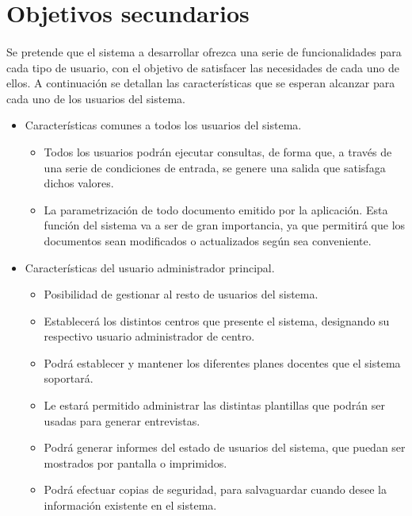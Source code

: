 \section{Objetivos secundarios}

\paragraph{}Se pretende que el sistema a desarrollar ofrezca una serie de
funcionalidades para cada tipo de usuario, con el objetivo de satisfacer las
necesidades de cada uno de ellos. A continuación se detallan las características
que se esperan alcanzar para cada uno de los usuarios del sistema.


\begin{itemize}
   \item Características comunes a todos los usuarios del sistema.
      \begin{itemize}
         \item Todos los usuarios podrán ejecutar consultas, de forma que, a
         través de una serie de condiciones de entrada, se genere una salida que
         satisfaga dichos valores.
         \item La parametrización de todo documento emitido por la aplicación.
         Esta función del sistema va a ser de gran importancia, ya que permitirá
         que los documentos sean modificados o actualizados según sea
         conveniente.
      \end{itemize}

   \item Características del usuario administrador principal.
      \begin{itemize}
         \item Posibilidad de gestionar al resto de usuarios del sistema.
         \item Establecerá los distintos centros que presente el sistema,
               designando su respectivo usuario administrador de centro.
         \item Podrá establecer y mantener los diferentes planes docentes que el
               sistema soportará.
         \item Le estará permitido administrar las distintas plantillas
         que podrán ser usadas para generar entrevistas.
         \item Podrá generar informes del estado de usuarios del sistema, que
         puedan ser mostrados por pantalla o imprimidos.
         \item Podrá efectuar copias de seguridad, para salvaguardar cuando
         desee la información existente en el sistema.
      \end{itemize}


\end{itemize}
